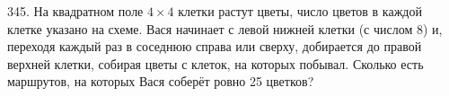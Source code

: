 345. На квадратном поле $4\times4$ клетки растут цветы, число цветов в каждой клетке указано на схеме. Вася начинает с левой нижней клетки (с числом 8) и, переходя каждый раз в соседнюю справа или сверху, добирается до правой верхней клетки, собирая цветы с клеток, на которых побывал. Сколько есть маршрутов, на которых Вася соберёт ровно 25 цветков?\\
\begin{figure}[ht!]
\end{figure}\\
